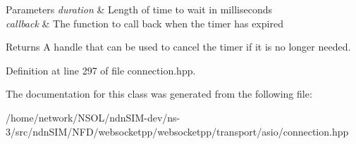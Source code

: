 \begin{DoxyParams}{Parameters}
{\em duration} & Length of time to wait in milliseconds\\
\hline
{\em callback} & The function to call back when the timer has expired\\
\hline
\end{DoxyParams}
\begin{DoxyReturn}{Returns}
A handle that can be used to cancel the timer if it is no longer needed. 
\end{DoxyReturn}


Definition at line 297 of file connection.\+hpp.



The documentation for this class was generated from the following file\+:\begin{DoxyCompactItemize}
\item 
/home/network/\+N\+S\+O\+L/ndn\+S\+I\+M-\/dev/ns-\/3/src/ndn\+S\+I\+M/\+N\+F\+D/websocketpp/websocketpp/transport/asio/connection.\+hpp\end{DoxyCompactItemize}
